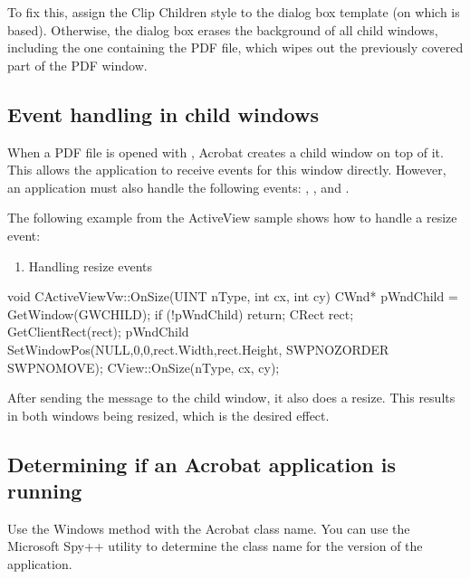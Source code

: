 \documentclass[letterpaper,12pt,english,openany,oneside]{sphinxmanual}
\begin{document}
To fix this, assign the Clip Children style to the dialog box template (on which  is based). Otherwise, the dialog box erases the background of all child windows, including the one containing the PDF file, which wipes out the previously covered part of the PDF window.


\subsection{Event handling in child windows}
\label{\detokenize{IAC_DevApp_OLE_Support:event-handling-in-child-windows}}
When a PDF file is opened with , Acrobat creates a child window on top of it. This allows the application to receive events for this window directly. However, an application must also handle the following events: , , and .

The following example from the ActiveView sample shows how to handle a resize event:
\begin{enumerate}
%
\item {} 
Handling resize events

\end{enumerate}

\begin{sphinxVerbatim}[commandchars=\\\{\}]
void CActiveViewVw::OnSize(UINT nType, int cx, int cy)
\PYGZob{}
    CWnd* pWndChild = GetWindow(GW\PYGZus{}CHILD);
    if (!pWndChild)
        return;
    CRect rect;
    GetClientRect(\PYGZam{}rect);
    pWndChild\PYGZhy{}\PYGZgt{}
        SetWindowPos(NULL,0,0,rect.Width,rect.Height,
                    SWP\PYGZus{}NOZORDER  SWP\PYGZus{}NOMOVE);
    CView::OnSize(nType, cx, cy);
\PYGZcb{}
\end{sphinxVerbatim}

After sending the message to the child window, it also does a resize. This results in both windows being resized, which is the desired effect.


\subsection{Determining if an Acrobat application is running}
\label{\detokenize{IAC_DevApp_OLE_Support:determining-if-an-acrobat-application-is-running}}
Use the Windows  method with the Acrobat class name. You can use the Microsoft Spy++ utility to determine the class name for the version of the application.
\end{document}

